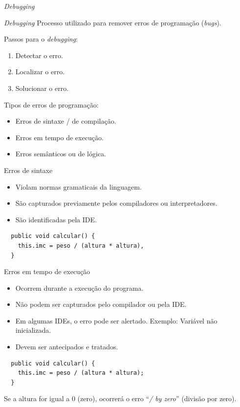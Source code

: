 \documentclass[handout]{beamer}
\begin{document}
\begin{frame}{\textit{Debugging}}

\begin{block}{\textit{Debugging}}
Processo utilizado para remover erros de programação (\textit{bugs}).
\end{block}

Passos para o \textit{debugging}:

\begin{enumerate}
\item Detectar o erro.
\item Localizar o erro.
\item Solucionar o erro.
\end{enumerate}

Tipos de erros de programação:

\begin{itemize}
\item Erros de sintaxe / de compilação.
\item Erros em tempo de execução.
\item Erros semânticos ou de lógica.
\end{itemize}
\end{frame}

\begin{frame}[fragile]{Erros de sintaxe}

\begin{itemize}
\item Violam normas gramaticais da linguagem.
\item São capturados previamente pelos compiladores ou interpretadores.
\item São identificadas pela IDE.
\end{itemize}

\begin{lstlisting}
  public void calcular() {
    this.imc = peso / (altura * altura),
  }
\end{lstlisting}
\end{frame}


\begin{frame}[fragile]{Erros em tempo de execução}

\begin{itemize}
\item Ocorrem durante a execução do programa.
\item Não podem ser capturados pelo compilador ou pela IDE. 
\item Em algumas IDEs, o erro pode ser alertado. Exemplo: Variável não inicializada.
\item Devem ser antecipados e tratados.
\end{itemize}

\begin{lstlisting}
  public void calcular() {
    this.imc = peso / (altura * altura);
  }
\end{lstlisting}

Se a altura for igual a 0 (zero), ocorrerá o erro ``\textit{/ by zero}'' (divisão por zero).
\end{frame}
\end{document}
